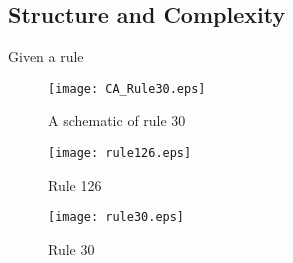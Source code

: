 \subsection{Structure and Complexity}
Given a rule

\begin{figure}
    \centering
    \texttt{[image: CA\_Rule30.eps]}
    \caption{\label{carule30} A schematic of rule 30}
\end{figure}

\begin{figure}
    \begin{minipage}[b]{0.49\textwidth}
        \centering
        \texttt{[image: rule126.eps]}
        \caption{\label{rule126} Rule 126}
    \end{minipage}
    \hspace{0.5cm}
    \begin{minipage}[b]{0.49\textwidth}
        \centering
        \texttt{[image: rule30.eps]}
        \caption{\label{rule30} Rule 30}
    \end{minipage}
\end{figure}
